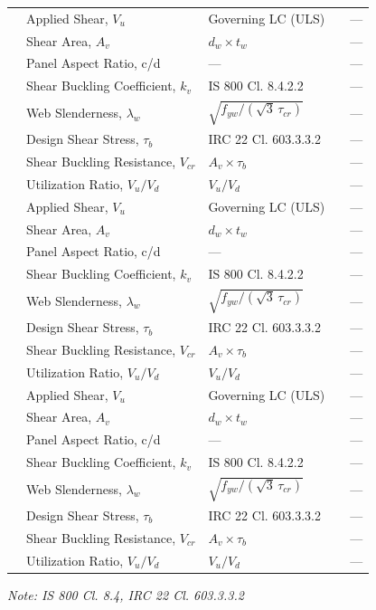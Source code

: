 \documentclass[12pt,a4paper]{report}
\numberwithin{table}{chapter}
\numberwithin{figure}{chapter}
\begin{document}
\begin{longtable}{|C{2.5cm}|C{3.5cm}|C{3.5cm}|>{\centering\arraybackslash}p{4.2cm}|C{1.8cm}|}
\hline
\endlastfoot
{} & Applied Shear, $V_u$ & Governing LC (ULS) &  & --- \\[6pt]
 & Shear Area, $A_v$ & $d_w \times t_w$ &  & --- \\[6pt]
 & Panel Aspect Ratio, c/d & --- &  & --- \\[6pt]
 & Shear Buckling Coefficient, $k_v$ & IS 800 Cl. 8.4.2.2 &  & --- \\[6pt]
 & Web Slenderness, $\lambda_w$ & $\sqrt{f_{yw}/(\sqrt{3}\,\tau_{cr})}$ &  & --- \\[6pt]
 & Design Shear Stress, $\tau_b$ & IRC 22 Cl. 603.3.3.2 &  & --- \\[6pt]
 & Shear Buckling Resistance, $V_{cr}$ & $A_v \times \tau_b$ &  & --- \\[6pt]
 & Utilization Ratio, $V_u / V_d$ & $V_u / V_d$ &  & --- \\[6pt]
\hline
{} & Applied Shear, $V_u$ & Governing LC (ULS) &  & --- \\[6pt]
 & Shear Area, $A_v$ & $d_w \times t_w$ &  & --- \\[6pt]
 & Panel Aspect Ratio, c/d & --- &  & --- \\[6pt]
 & Shear Buckling Coefficient, $k_v$ & IS 800 Cl. 8.4.2.2 &  & --- \\[6pt]
 & Web Slenderness, $\lambda_w$ & $\sqrt{f_{yw}/(\sqrt{3}\,\tau_{cr})}$ &  & --- \\[6pt]
 & Design Shear Stress, $\tau_b$ & IRC 22 Cl. 603.3.3.2 &  & --- \\[6pt]
 & Shear Buckling Resistance, $V_{cr}$ & $A_v \times \tau_b$ &  & --- \\[6pt]
 & Utilization Ratio, $V_u / V_d$ & $V_u / V_d$ &  & --- \\[6pt]
\hline
{} & Applied Shear, $V_u$ & Governing LC (ULS) &  & --- \\[6pt]
 & Shear Area, $A_v$ & $d_w \times t_w$ &  & --- \\[6pt]
 & Panel Aspect Ratio, c/d & --- &  & --- \\[6pt]
 & Shear Buckling Coefficient, $k_v$ & IS 800 Cl. 8.4.2.2 &  & --- \\[6pt]
 & Web Slenderness, $\lambda_w$ & $\sqrt{f_{yw}/(\sqrt{3}\,\tau_{cr})}$ &  & --- \\[6pt]
 & Design Shear Stress, $\tau_b$ & IRC 22 Cl. 603.3.3.2 &  & --- \\[6pt]
 & Shear Buckling Resistance, $V_{cr}$ & $A_v \times \tau_b$ &  & --- \\[6pt]
 & Utilization Ratio, $V_u / V_d$ & $V_u / V_d$ &  & --- \\[6pt]
\hline
\end{longtable}
\noindent\textit{Note: IS 800 Cl. 8.4, IRC 22 Cl. 603.3.3.2}
\end{document}
